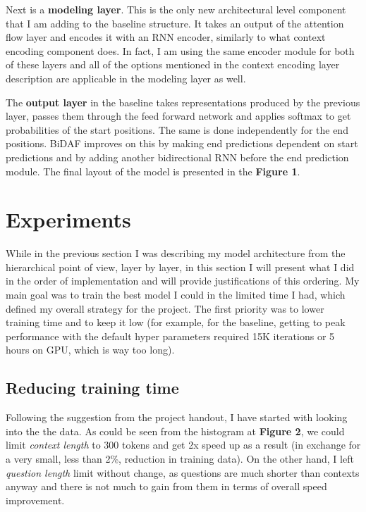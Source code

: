 \documentclass{article}
\begin{document}
\captionsetup{format=plain, font=footnotesize, labelfont=bf}
\begin{adjustbox}{max width=\textwidth, caption={Model Architecture}, nofloat}

\end{adjustbox}

Next is a {\bf modeling layer}. This is the only new architectural level component that I am adding to the baseline structure. It takes an output of the attention flow layer and encodes it with an RNN encoder, similarly to what context encoding component does. In fact, I am using the same encoder module for both of these layers and all of the options mentioned in the context encoding layer description are applicable in the modeling layer as well.

The {\bf output layer} in the baseline takes representations produced by the previous layer, passes them through the feed forward network and applies softmax to get probabilities of the start positions. The same is done independently for the end positions. BiDAF improves on this by making end predictions dependent on start predictions and by adding another bidirectional RNN before the end prediction module. The final layout of the model is presented in the {\bf Figure 1}.

\section{Experiments} While in the previous section I was describing my model architecture from the hierarchical point of view, layer by layer, in this section I will present what I did in the order of implementation and will provide justifications of this ordering. My main goal was to train the best model I could in the limited time I had, which defined my overall strategy for the project. The first priority was to lower training time and to keep it low (for example, for the baseline, getting to peak performance  with the default hyper parameters required 15K iterations or 5 hours on GPU, which is way too long).

\subsection{Reducing training time}
Following the suggestion from the project handout, I have started with looking into the the data. As could be seen from the histogram at {\bf Figure 2}, we could limit {\it context length} to 300 tokens and get 2x speed up as a result (in exchange for a very small, less than 2\%, reduction in training data). On the other hand, I left {\it question length} limit without change, as questions are much shorter than contexts anyway and there is not much to gain from them in terms of overall speed improvement.
\end{document}
